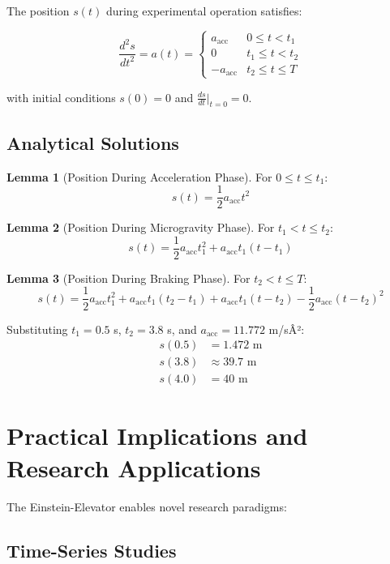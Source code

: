 ﻿\documentclass[a4paper,12pt]{article}
\theoremstyle{definition}
\newtheorem{lemma}{Lemma}
\begin{document}
The position $s(t)$ during experimental operation satisfies:

\begin{equation}
\frac{d^2s}{dt^2} = a(t) = \begin{cases}
a_{\text{acc}} & 0 \leq t < t_1 \\
0 & t_1 \leq t < t_2 \\
-a_{\text{acc}} & t_2 \leq t \leq T
\end{cases}
\end{equation}

with initial conditions $s(0) = 0$ and $\frac{ds}{dt}|_{t=0} = 0$.

\subsection{Analytical Solutions}

\begin{lemma}[Position During Acceleration Phase]
For $0 \leq t \leq t_1$:
\[
s(t) = \frac{1}{2} a_{\text{acc}} t^2
\]
\end{lemma}

\begin{lemma}[Position During Microgravity Phase]
For $t_1 < t \leq t_2$:
\[
s(t) = \frac{1}{2} a_{\text{acc}} t_1^2 + a_{\text{acc}} t_1 (t - t_1)
\]
\end{lemma}

\begin{lemma}[Position During Braking Phase]
For $t_2 < t \leq T$:
\[
s(t) = \frac{1}{2} a_{\text{acc}} t_1^2 + a_{\text{acc}} t_1 (t_2 - t_1) + a_{\text{acc}} t_1 (t - t_2) - \frac{1}{2} a_{\text{acc}} (t - t_2)^2
\]
\end{lemma}

Substituting $t_1 = 0.5$ s, $t_2 = 3.8$ s, and $a_{\text{acc}} = 11.772$ m/sÂ²:
\begin{align}
s(0.5) &= 1.472 \text{ m} \\
s(3.8) &\approx 39.7 \text{ m} \\
s(4.0) &= 40 \text{ m}
\end{align}

\section{Practical Implications and Research Applications}

The Einstein-Elevator enables novel research paradigms:

\subsection{Time-Series Studies}
\end{document}
